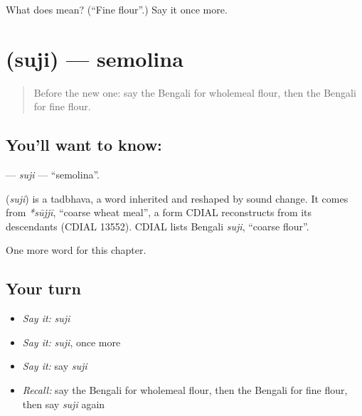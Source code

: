 \begin{tcolorbox}[breakable,colback=teal!4,colframe=teal!35!black,title={Before you move on}]
What does  mean? (\textquotedblleft{}Fine flour\textquotedblright{}.) Say it once more.
\end{tcolorbox}
\section[\texorpdfstring{\bn{সুজি} (suji)}{সুজি (suji)}]{ (suji) — semolina}

\label{lesson:BN-C231-suji}



\begin{quote}
Before the new one: say the Bengali for wholemeal flour, then the Bengali for fine flour.
\end{quote}

\subsection*{You'll want to know: }
\textbf{} — \emph{suji} — \textquotedblleft{}semolina\textquotedblright{}.

\begin{cousinweb}
\textbf{} (\emph{suji}) is a tadbhava, a word inherited and reshaped by sound change. It comes from \emph{*sūjjī}, \textquotedblleft{}coarse wheat meal\textquotedblright{}, a form CDIAL reconstructs from its descendants (CDIAL 13552). CDIAL lists Bengali \emph{suji}, \textquotedblleft{}coarse flour\textquotedblright{}.
\end{cousinweb}

\begin{grammarlens}[title={What you've built}]
One more word for this chapter.
\end{grammarlens}

\subsection*{Your turn}
\begin{itemize}
\raggedright
  \item \emph{Say it:} \emph{suji}
  \item \emph{Say it:} \emph{suji}, once more
  \item \emph{Say it:} say \emph{suji}
  \item \emph{Recall:} say the Bengali for wholemeal flour, then the Bengali for fine flour, then say \emph{suji} again
\end{itemize}

